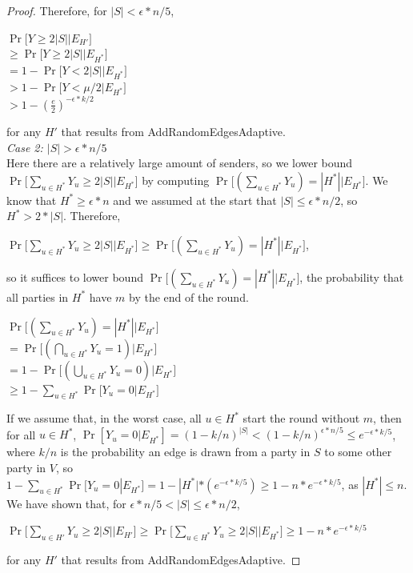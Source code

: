 \documentclass{article}
\begin{document}
\begin{proof}
Therefore, for $|S| < \epsilon * n / 5$, 
\begin{center}
    $\Pr \big [Y \geq 2|S| \big | E_{H'} \big]$ \\
    $ \geq \Pr\big [Y \geq 2|S| \big | E_{H^*}\big ]$ \\ $ = 1 - \Pr\big [Y < 2|S| \big | E_{H^*}] $ \\ $> 1 - \Pr\big [Y < \mu / 2 \big | E_{H^*}\big ]$ \\ $ > 1 - (\frac{e}{2})^{-\epsilon*k/2}$
\end{center}

for any $H'$ that results from AddRandomEdgesAdaptive.\\
\textit{Case 2: $|S| > \epsilon * n/5$}\\
Here there are a relatively large amount of senders, so we lower bound $\Pr\big [\sum_{u \in {H^*}} Y_u \geq 2|S| \big | E_{H^*}\big ]$ by computing $\Pr\big [(\sum_{u \in {H^*}} Y_u) = |H^*| \big | E_{H^*}\big ]$. We know that $H^* \geq \epsilon * n$ and we assumed at the start that $|S| \leq \epsilon * n / 2$, so $H^* > 2*|S|$. Therefore,
\begin{center}
    $\Pr\big [\sum_{u \in {H^*}} Y_u \geq 2|S| \big | E_{H^*}\big ] \geq \Pr\big [(\sum_{u \in {H^*}} Y_u) = |H^*| \big | E_{H^*}\big ]$,
\end{center}
so it suffices to lower bound $\Pr\big [(\sum_{u \in {H^*}} Y_u) = |H^*| \big | E_{H^*}\big ]$, the probability that all parties in $H^*$ have $m$ by the end of the round. 

\begin{center}
$\Pr\big [(\sum_{u \in {H^*}} Y_u) = |H^*| \big | E_{H^*}\big ] $\\ $= \Pr\big [(\bigcap_{u \in {H^*}} Y_u = 1)\big | E_{H^*}\big ]$ \\$ = 1 - \Pr\big[(\bigcup_{u \in {H^*}} Y_u = 0)\big | E_{H^*}\big ]$ \\ $\geq 1 - \sum_{u \in {H^*}} \Pr\big [Y_u = 0 \big | E_{H^*}\big ]$

\end{center}

If we assume that, in the worst case, all $u \in H^*$ start the round without $m$, then for all $u \in H^*$, $\Pr[Y_u = 0 | E_{H^*}] = (1 - k/n)^{|S|} < (1 - k/n)^{\epsilon * n/5} \leq e^{-\epsilon * k / 5}$, where $k/n$ is the probability an edge is drawn from a party in $S$ to some other party in $V$, so  $1 - \sum_{u \in {H^*}} \Pr[Y_u = 0 | E_{H^*}] = 1 - |H^*| * (e^{-\epsilon * k / 5}) \geq 1 - n * e^{-\epsilon * k / 5}$, as $|H^*| \leq n$. We have shown that, for $ \epsilon * n/5 < |S| \leq \epsilon * n / 2$, 
\begin{center}
    $\Pr\big [\sum_{u \in {H'}} Y_u \geq 2|S| \big | E_{H'}\big ] \geq \Pr\big [\sum_{u \in {H^*}} Y_u \geq 2|S| \big | E_{H^*}\big ] \geq 1 - n * e^{-\epsilon * k / 5}$
\end{center}
for any $H'$ that results from AddRandomEdgesAdaptive.


\end{proof}
\end{document}
